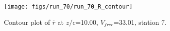 \begin{figure}[H]
\centering
\texttt{[image: figs/run\_70/run\_70\_R\_contour]}
\caption{Contour plot of $\overline{r}$ at $z/c$=10.00, $V_{free}$=33.01, station 7.}
\label{fig:run_70_R_contour}
\end{figure}


